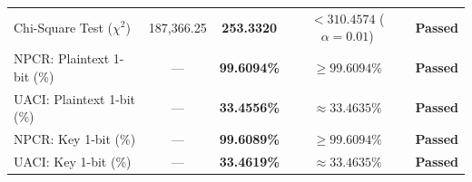 \begin{table}[htbp]
{\begin{tabular}{@{}lcccc@{}}
Chi-Square Test ($\chi^2$)     & 187,366.25 & \textbf{253.3320} & $< 310.4574$ ($\alpha=0.01$) & \textbf{Passed} \\
NPCR: Plaintext 1-bit (\%)     & ---      & \textbf{99.6094\%} & $\ge 99.6094\%$ & \textbf{Passed} \\
UACI: Plaintext 1-bit (\%)     & ---      & \textbf{33.4556\%} & $\approx 33.4635\%$ & \textbf{Passed} \\
NPCR: Key 1-bit (\%)           & ---      & \textbf{99.6089\%} & $\ge 99.6094\%$ & \textbf{Passed} \\
UACI: Key 1-bit (\%)           & ---      & \textbf{33.4619\%} & $\approx 33.4635\%$ & \textbf{Passed} \\ \bottomrule
\end{tabular}%
}
\end{table}

